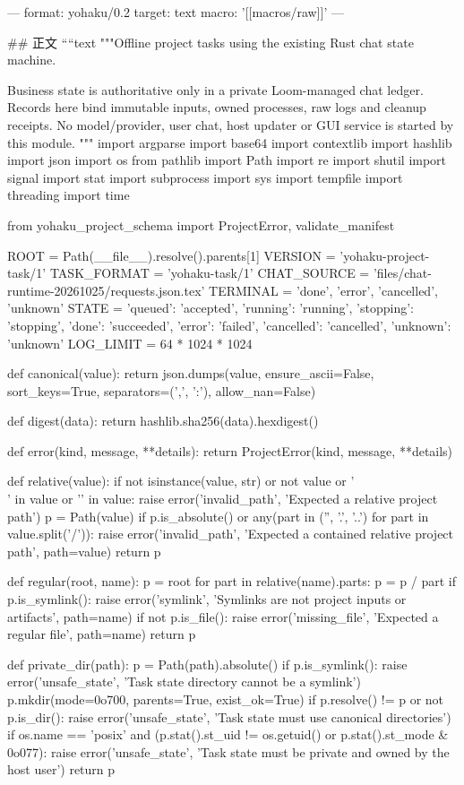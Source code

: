 ---
format: yohaku/0.2
target: text
macro: '[[macros/raw]]'
---

## 正文
````text
"""Offline project tasks using the existing Rust chat state machine.

Business state is authoritative only in a private Loom-managed chat ledger.
Records here bind immutable inputs, owned processes, raw logs and cleanup receipts.
No model/provider, user chat, host updater or GUI service is started by this module.
"""
import argparse
import base64
import contextlib
import hashlib
import json
import os
from pathlib import Path
import re
import shutil
import signal
import stat
import subprocess
import sys
import tempfile
import threading
import time

from yohaku_project_schema import ProjectError, validate_manifest

ROOT = Path(__file__).resolve().parents[1]
VERSION = 'yohaku-project-task/1'
TASK_FORMAT = 'yohaku-task/1'
CHAT_SOURCE = 'files/chat-runtime-20261025/requests.json.tex'
TERMINAL = {'done', 'error', 'cancelled', 'unknown'}
STATE = {'queued': 'accepted', 'running': 'running', 'stopping': 'stopping',
         'done': 'succeeded', 'error': 'failed', 'cancelled': 'cancelled', 'unknown': 'unknown'}
LOG_LIMIT = 64 * 1024 * 1024


def canonical(value):
    return json.dumps(value, ensure_ascii=False, sort_keys=True, separators=(',', ':'), allow_nan=False)


def digest(data):
    return hashlib.sha256(data).hexdigest()


def error(kind, message, **details):
    return ProjectError(kind, message, **details)


def relative(value):
    if not isinstance(value, str) or not value or '\\' in value or '\0' in value:
        raise error('invalid_path', 'Expected a relative project path')
    p = Path(value)
    if p.is_absolute() or any(part in ('', '.', '..') for part in value.split('/')):
        raise error('invalid_path', 'Expected a contained relative project path', path=value)
    return p


def regular(root, name):
    p = root
    for part in relative(name).parts:
        p = p / part
        if p.is_symlink():
            raise error('symlink', 'Symlinks are not project inputs or artifacts', path=name)
    if not p.is_file():
        raise error('missing_file', 'Expected a regular file', path=name)
    return p


def private_dir(path):
    p = Path(path).absolute()
    if p.is_symlink():
        raise error('unsafe_state', 'Task state directory cannot be a symlink')
    p.mkdir(mode=0o700, parents=True, exist_ok=True)
    if p.resolve() != p or not p.is_dir():
        raise error('unsafe_state', 'Task state must use canonical directories')
    if os.name == 'posix' and (p.stat().st_uid != os.getuid() or p.stat().st_mode & 0o077):
        raise error('unsafe_state', 'Task state must be private and owned by the host user')
    return p


